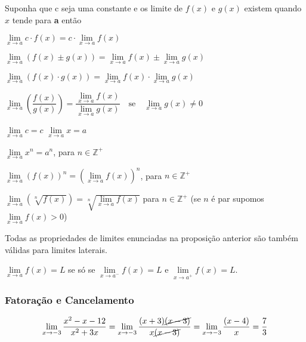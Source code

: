  \begin{tcolorbox}
\begin{prop} Suponha que c seja uma constante e os limite de $f(x)$ e $g(x)$ existem quando $x$ tende para \textbf{a} então

\begin{enumerate}
\begin{multicols}{2}
    \item $\lim\limits_{x \to a} c\cdot f(x) = c\cdot \lim\limits_{x \to a}f(x)$
    
    \item $\lim\limits_{x \to a} \left(f(x) \pm g(x)\right) = \lim\limits_{x \to a} f(x) \pm \lim\limits_{x \to a}g(x)$
    
    \item $\lim\limits_{x \to a} \left(f(x)\cdot g(x)\right) = \lim\limits_{x \to a} f(x) \cdot \lim\limits_{x \to a}g(x)$
    
    \item $\lim\limits_{x \to a} \left(\dfrac{f(x)}{g(x)}\right)= \dfrac{\lim\limits_{x \to a} f(x)}{\lim\limits_{x \to a}g(x)} \quad \text{se} \quad \lim\limits_{x \to a}g(x)\neq 0$
    \item $\lim\limits_{x\to a}c=c$ \qquad $\lim\limits_{x\to a}x=a$
    \item $\lim\limits_{x\to a}x^n=a^n$, para $n\in \mathbb{Z}^+$
    \item $\lim\limits_{x \to a} \left(f(x)\right)^n = \left(\lim\limits_{x \to a} f(x)\right)^n$, para $n\in \mathbb{Z}^+$
    
    \item $\lim\limits_{x \to a} \left(\sqrt[n]{f(x)}\right)= \sqrt[n]{\lim\limits_{x \to a}f(x)}$ para $n\in \mathbb{Z^{+}}$ (se $n$ é par supomos $\lim\limits_{x\to a}f(x)>0$)
    
\end{multicols}
\end{enumerate}
\end{prop}

\begin{prop}
Todas as propriedades de limites enunciadas na proposição anterior são também válidas para limites laterais.
\end{prop}
\begin{teorema}$\lim\limits_{x \to a}f(x)=L$ se só se  $\lim\limits_{x \to a^-}f(x)=L$ e $\lim\limits_{x \to a^+}f(x)=L$.
\end{teorema}


\subsubsection*{Fatoração e Cancelamento}
\begin{align*}
    \lim\limits_{x \to -3}\dfrac{x^2-x-12}{x^2+3x}=\lim\limits_{x \to -3}\dfrac{(x+3)\cancel{(x-3)}}{x\cancel{(x-3)}}=\lim\limits_{x \to -3}\dfrac{(x-4)}{x}=\frac{7}{3}
\end{align*}

\end{tcolorbox}
